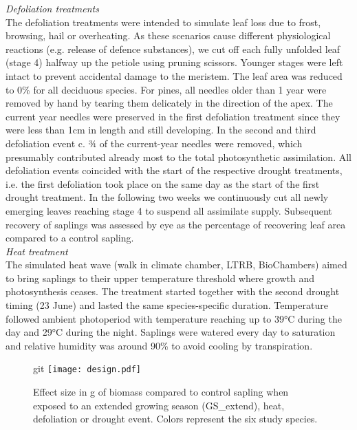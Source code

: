 \documentclass{article}
\begin{document}
	\textit{Defoliation treatments} \\
	The defoliation treatments were intended to simulate leaf loss due to frost, browsing, hail or overheating. As these scenarios cause different physiological reactions (e.g. release of defence substances), we cut off each fully unfolded leaf (stage 4) halfway up the petiole using pruning scissors. Younger stages were left intact to prevent accidental damage to the meristem. The leaf area was reduced to 0\% for all deciduous species. For pines, all needles older than 1 year were removed by hand by tearing them delicately in the direction of the apex. The current year needles were preserved in the first defoliation treatment since they were less than 1cm in length and still developing. In the second and third defoliation event c. ¾ of the current-year needles were removed, which presumably contributed already most to the total photosynthetic assimilation. All defoliation events coincided with the start of the respective drought treatments, i.e. the first defoliation took place on the same day as the start of the first drought treatment. In the following two weeks we continuously cut all newly emerging leaves reaching stage 4 to suspend all assimilate supply. %
	Subsequent recovery of saplings was assessed by eye as the percentage of recovering leaf area compared to a control sapling. \\
	
	\textit{Heat treatment} \\
	The simulated heat wave (walk in climate chamber, LTRB, BioChambers) aimed to bring saplings to their upper temperature threshold where growth and photosynthesis ceases. The treatment started together with the second drought timing (23 June) and lasted the same species-specific duration. Temperature followed ambient photoperiod with temperature reaching up to 39°C during the day and 29°C during the night. Saplings were watered every day to saturation and relative humidity was around 90\% to avoid cooling by transpiration. 
	
		\begin{figure}[H]git 
		\centering
		\texttt{[image: design.pdf]} 
		\caption{Effect size in g of biomass compared to control sapling when exposed to an extended growing season (GS\_extend), heat, defoliation or drought event. Colors represent the six study species. }
		\label{fig:fig_1xxx}
	\end{figure}
	
\end{document}
